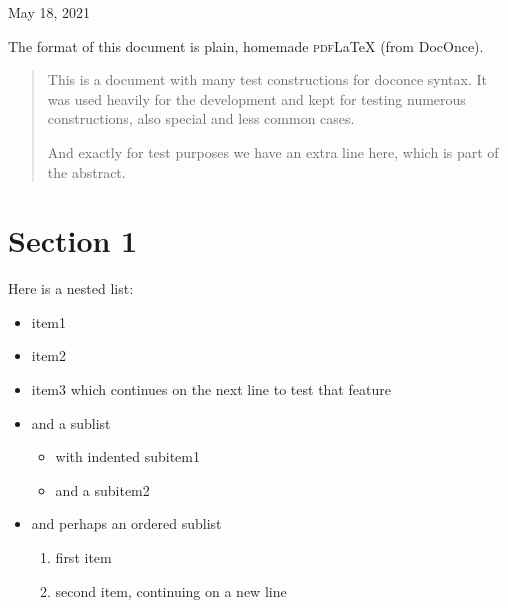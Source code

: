 \n\documentclass[%
oneside,                 %
final,                   %
10pt]{article}
\theoremstyle{definition}
\begin{document}

\begin{center}
May 18, 2021
\end{center}

\vspace{1cm}


\tableofcontents

\vspace{1cm} %


The format of this document is
plain, homemade \textsc{pdf}{\LaTeX} (from DocOnce).

\begin{abstract}
This is a document with many test constructions for doconce syntax.
It was used heavily for the development and kept for testing
numerous constructions, also special and less common cases.

And exactly for test purposes we have an extra line here, which
is part of the abstract.

\end{abstract}

\section{Section 1}
\label{sec1}

Here is a nested list:

\begin{itemize}
  \item item1

  \item item2

  \item item3 which continues on the next line to test that feature

  \item and a sublist
\begin{itemize}

    \item with indented subitem1

    \item and a subitem2

\end{itemize}

\noindent
  \item and perhaps an ordered sublist
\begin{enumerate}

   \item first item

   \item second item, continuing on a new line
\end{enumerate}

\noindent
\end{itemize}
\end{document}

